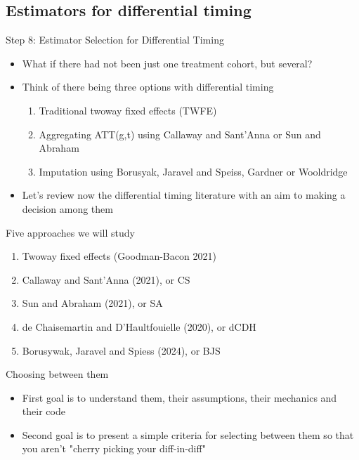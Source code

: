 \documentclass{beamer}
\begin{document}
\subsection{Estimators for differential timing} 

\begin{frame}{Step 8: Estimator Selection for Differential Timing}

\begin{itemize}
\item What if there had not been just one treatment cohort, but several? 
\item Think of there being three options with differential timing 
	\begin{enumerate}
	\item Traditional twoway fixed effects (TWFE)
	\item Aggregating ATT(g,t) using Callaway and Sant'Anna or Sun and Abraham
	\item Imputation using Borusyak, Jaravel and Speiss, Gardner or Wooldridge
	\end{enumerate}
\item  Let's review now the differential timing literature with an aim to making a decision among them
\end{itemize}

\end{frame}

\begin{frame}{Five approaches we will study}

\begin{enumerate}
\item Twoway fixed effects (Goodman-Bacon 2021)
\item Callaway and Sant'Anna (2021), or CS
\item Sun and Abraham (2021), or SA
\item de Chaisemartin and D'Haultfouielle (2020), or dCDH
\item Borusywak, Jaravel and Spiess (2024), or BJS
\end{enumerate}
\end{frame}

\begin{frame}{Choosing between them}

\begin{itemize}
\item First goal is to understand them, their assumptions, their mechanics and their code
\item Second goal is to present a simple criteria for selecting between them so that you aren't "cherry picking your diff-in-diff"
\end{itemize}

\end{frame}
\end{document}
